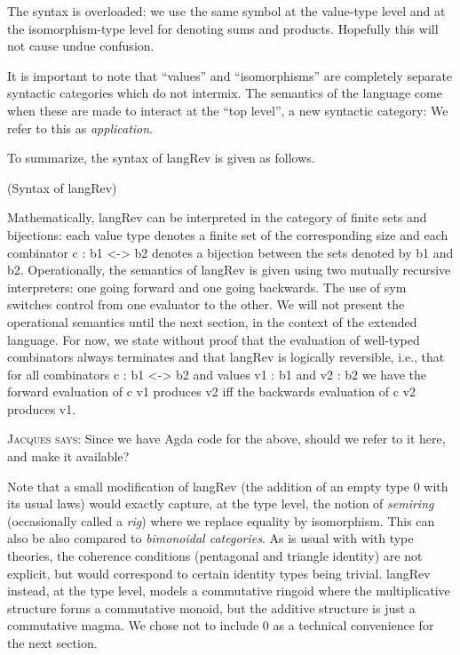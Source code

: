 \documentclass{llncs}
\newcommand{\jacques}[1]{\textsc{Jacques says:} #1}
\begin{document}
\noindent The syntax is overloaded: we use the same symbol at the value-type level
and at the isomorphism-type level for denoting sums and products.  Hopefully
this will not cause undue confusion.

It is important to note that ``values'' and ``isomorphisms'' are 
completely separate syntactic categories which do not intermix.  The 
semantics of the language come when these are made to interact at
the ``top level'', a new syntactic category:
\noindent We refer to this as \emph{application}.

\noindent
To summarize, the syntax of {{langRev}} is given as follows. 

\begin{definition}{(Syntax of {{langRev}})}
\label{def:Pi}
%
\end{definition}

Mathematically, {{langRev}} can be interpreted in the category of finite sets
and bijections: each value type denotes a finite set of the corresponding size
and each combinator {{c : b1 <-> b2}} denotes a bijection between the sets
denoted by {{b1}} and {{b2}}. Operationally, the semantics of {{langRev}} is
given using two mutually recursive interpreters: one going forward and one
going backwards. The use of {{sym}} switches control from one evaluator to
the other. We will not present the operational semantics until the next
section, in the context of the extended language. For now, we state without
proof that the evaluation of well-typed combinators always terminates and
that {{langRev}} is logically reversible, i.e., that for all combinators 
{{c : b1 <-> b2}} and values {{v1 : b1}} and {{v2 : b2}} we have the forward
evaluation of {{c v1}} produces {{v2}} iff the backwards evaluation of 
{{c v2}} produces {{v1}}.

\jacques{Since we have Agda code for the above, should we refer to it
here, and make it available?}

Note that a small modification of {{langRev}} (the addition of an
empty type {{0}} with its usual laws) would exactly capture, at the type
level, the notion of \emph{semiring} (occasionally called a \emph{rig}) where
we replace equality by isomorphism.  This can also be also compared to
\emph{bimonoidal categories}.  As is usual with with type theories, the
coherence conditions (pentagonal and triangle identity) are not explicit,
but would correspond to certain identity types being trivial.  {{langRev}}
instead, at the type level, models a commutative ringoid where the
multiplicative structure forms a commutative monoid, but the additive structure
is just a commutative magma.  We chose not to include {{0}} as a technical
convenience for the next section.
\end{document}
